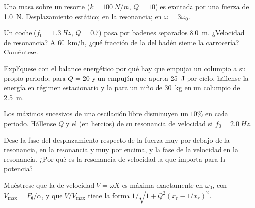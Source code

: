 \begin{exercise}[$\star$]\label{exo:b1:oscillators-resonance:4}
Una masa sobre un resorte ($k = \qty{100}{N/m}$, $Q = 10$) es excitada por
una fuerza de  \qty{1.0}{N}. Desplazamiento estático;  en
la resonancia;  en $\omega = 3\omega_0$.
\end{exercise}

\begin{exercise}[$\star\star$]\label{exo:b1:oscillators-resonance:5}
Un coche ($f_0 = \qty{1.3}{Hz}$, $Q = 0.7$) pasa por badenes separados
\qty{8.0}{m}. ¿Velocidad de resonancia? A \qty{60}{km/h}, ¿qué fracción de
la  del badén siente la carrocería? Coméntese.
\end{exercise}

\begin{exercise}[$\star\star$]\label{exo:b1:oscillators-resonance:6}
Explíquese con el balance energético por qué hay que empujar un columpio a
su propio periodo; para $Q = 20$ y un empujón que aporta \qty{25}{J} por
ciclo, hállense la energía en régimen estacionario y la  para un
niño de \qty{30}{kg} en un columpio de \qty{2.5}{m}.
\end{exercise}

\begin{exercise}[$\star\star$]\label{exo:b1:oscillators-resonance:7}
Los máximos sucesivos de una oscilación libre disminuyen un $10\%$ en cada
periodo. Hállense $Q$ y el  (en hercios) de su resonancia de
velocidad si $f_0 = \qty{2.0}{Hz}$.
\end{exercise}

\begin{exercise}[$\star\star$]\label{exo:b1:oscillators-resonance:8}
Dese la fase del desplazamiento respecto de la fuerza muy por debajo de la
resonancia, en la resonancia y muy por encima, y la fase de la velocidad
en la resonancia. ¿Por qué es la resonancia de velocidad la que importa
para la potencia?
\end{exercise}

\begin{exercise}[$\star\star$]\label{exo:b1:oscillators-resonance:9}
Muéstrese que la  de velocidad $V = \omega X$ es máxima exactamente
en $\omega_0$, con $V_{\max} = F_0/\alpha$, y que $V/V_{\max}$ tiene la
forma $1/\sqrt{1 + Q^2(x_r - 1/x_r)^2}$.
\end{exercise}

